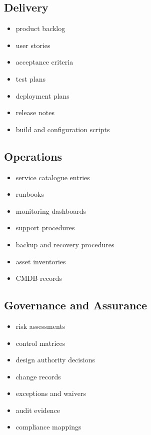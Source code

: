 \documentclass[
  british,
  letterpaper,
  DIV=11,
  numbers=noendperiod]{scrartcl}
\providecommand{\tightlist}{%
  \setlength{\itemsep}{0pt}\setlength{\parskip}{0pt}}
\begin{document}
\subsection{Delivery}\label{delivery}

\begin{itemize}
\tightlist
\item
  product backlog
\item
  user stories
\item
  acceptance criteria
\item
  test plans
\item
  deployment plans
\item
  release notes
\item
  build and configuration scripts
\end{itemize}

\subsection{Operations}\label{operations-1}

\begin{itemize}
\tightlist
\item
  service catalogue entries
\item
  runbooks
\item
  monitoring dashboards
\item
  support procedures
\item
  backup and recovery procedures
\item
  asset inventories
\item
  CMDB records
\end{itemize}

\subsection{Governance and Assurance}\label{governance-and-assurance}

\begin{itemize}
\tightlist
\item
  risk assessments
\item
  control matrices
\item
  design authority decisions
\item
  change records
\item
  exceptions and waivers
\item
  audit evidence
\item
  compliance mappings
\end{itemize}
\end{document}
